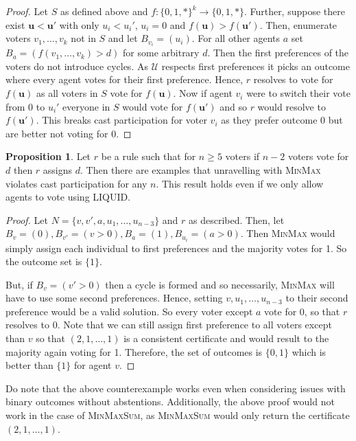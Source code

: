 \documentclass[11pt,a4paper, titlepage]{article}
\theoremstyle{definition}
\newtheorem{proposition}[theorem]{Proposition}
\let\vec\mathbf
\begin{document}
\begin{proof}
    Let $S$ as defined above and $f: \{0, 1, *\}^k \longrightarrow \{0,1, *\}$.
    Further, suppose there exist $\vec{u} < \vec{u}'$ with only $u_i < u_i'$, $u_i = 0$ and $f(\vec{u}) > f(\vec{u}')$. Then, enumerate voters $v_1, \ldots, v_k$ not in $S$ and let $B_{v_i} = (u_i)$. 
    For all other agents $a$ set $B_{a} = (f(v_1, \ldots, v_k) > d)$ for some arbitrary $d$. 
    Then the first preferences of the voters do not introduce cycles. 
    As $\mathcal{U}$ respects first preferences it picks an outcome where every agent votes for their first preference.
    Hence, $r$ resolves to vote for $f(\vec{u})$ as all voters in $S$ vote for $f(\vec{u})$.
    Now if agent $v_i$ were to switch their vote from $0$ to $u_i'$ everyone in $S$ would vote for $f(\vec{u}')$ and so $r$ would resolve to $f(\vec{u}')$. This breaks cast participation for voter $v_i$ as they prefer outcome 0 but are better not voting for 0.
\end{proof}

\begin{proposition}
    \label{prop:cast-max}
    Let $r$ be a rule such that for $n \geq 5$ voters if $n-2$ voters vote for $d$ then $r$ assigns $d$. Then there are examples that unravelling with \textsc{MinMax} violates cast participation for any $n$. This result holds even if we only allow agents to vote using LIQUID.
\end{proposition}

\begin{proof}
    Let $N = \{v, v', a, u_1, \ldots, u_{n-3}\}$ and $r$ as described. Then, let $B_v = (0), B_{v'} = (v > 0), B_a = (1), B_{u_i} = (a > 0)$. Then \textsc{MinMax} would simply assign each individual to first preferences and the majority votes for 1. So the outcome set is $\{1\}$.

    But, if $B_v = (v' > 0)$ then a cycle is formed and so necessarily, \textsc{MinMax} will have to use some second preferences. Hence, setting $v, u_1, \ldots, u_{n-3}$ to their second preference would be a valid solution. So every voter except $a$ vote for $0$, so that $r$ resolves to $0$. 
    Note that we can still assign first preference to all voters except than $v$ so that $(2, 1, \ldots, 1)$ is a consistent certificate and would result to the majority again voting for 1. 
    Therefore, the set of outcomes is $\{0, 1\}$ which is better than $\{1\}$ for agent $v$.
\end{proof}

Do note that the above counterexample works even when considering issues with binary outcomes without abstentions.
Additionally, the above proof would not work in the case of \textsc{MinMaxSum}, as \textsc{MinMaxSum} would only return the certificate $(2, 1, \ldots, 1)$.
\end{document}
